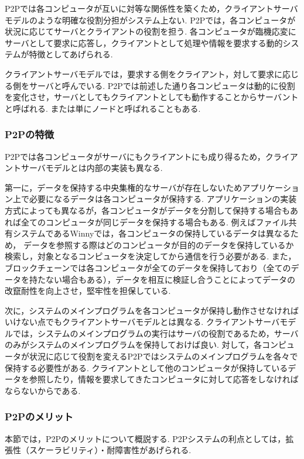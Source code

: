 P2Pでは各コンピュータが互いに対等な関係性を築くため，クライアントサーバモデルのような明確な役割分担がシステム上ない.
P2Pでは，各コンピュータが状況に応じてサーバとクライアントの役割を担う.
各コンピュータが臨機応変にサーバとして要求に応答し，クライアントとして処理や情報を要求する動的システムが特徴としてあげられる.

クライアントサーバモデルでは，要求する側をクライアント，対して要求に応じる側をサーバと呼んでいる.
P2Pでは前述した通り各コンピュータは動的に役割を変化させ，サーバとしてもクライアントとしても動作することからサーバントと呼ばれる.
または単にノードと呼ばれることもある.

\subsubsection{P2Pの特徴}

P2Pでは各コンピュータがサーバにもクライアントにも成り得るため，クライアントサーバモデルとは内部の実装も異なる.

第一に，データを保持する中央集権的なサーバが存在しないためアプリケーション上で必要になるデータは各コンピュータが保持する.
アプリケーションの実装方式によっても異なるが，各コンピュータがデータを分割して保持する場合もあれば全てのコンピュータが同じデータを保持する場合もある.
例えばファイル共有システムであるWinnyでは，各コンピュータの保持しているデータは異なるため，
データを参照する際はどのコンピュータが目的のデータを保持しているか検索し，対象となるコンピュータを決定してから通信を行う必要がある.
また，ブロックチェーンでは各コンピュータが全てのデータを保持しており（全てのデータを持たない場合もある），データを相互に検証し合うことによってデータの改竄耐性を向上させ，堅牢性を担保している.

次に，システムのメインプログラムを各コンピュータが保持し動作させなければいけない点でもクライアントサーバモデルとは異なる.
クライアントサーバモデルでは，システムのメインプログラムの実行はサーバの役割であるため，サーバのみがシステムのメインプログラムを保持しておけば良い.
対して，各コンピュータが状況に応じて役割を変えるP2Pではシステムのメインプログラムを各々で保持する必要性がある.
クライアントとして他のコンピュータが保持しているデータを参照したり，情報を要求してきたコンピュータに対して応答をしなければならないからである.

\subsubsection{P2Pのメリット}

本節では，P2Pのメリットについて概説する.
P2Pシステムの利点としては，拡張性（スケーラビリティ）・耐障害性があげられる.

